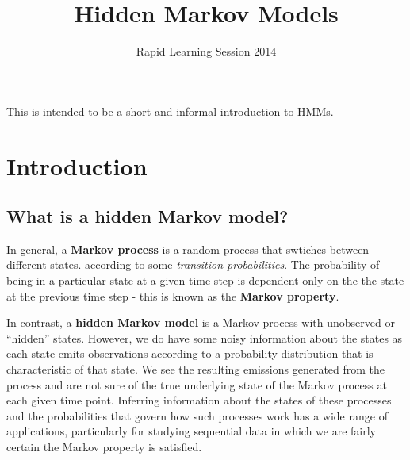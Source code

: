 \documentclass[11pt, oneside]{article}
\title{Hidden Markov Models}
\author{Rapid Learning Session 2014}
\date{}
\begin{document}
\maketitle

This is intended to be a short and informal introduction to HMMs.

\section{Introduction}
\subsection{What is a hidden Markov model?}
In general, a \textbf{Markov process} is a random process that swtiches between different states.
according to some \textit{transition probabilities}. The probability of being in a particular state at a given time step is dependent only on the the state at the previous time step - this is known as the \textbf{Markov property}. %


In contrast, a \textbf{hidden Markov model} is a Markov process with unobserved or ``hidden'' states. However, we do have some noisy information about the states as each state emits observations according to a probability distribution that is characteristic of that state. We see the resulting emissions generated from the process and are not sure of the true underlying state of the Markov process at each given time point. Inferring information about the states of these processes and the probabilities that govern how such processes work has a wide range of applications, particularly for studying sequential data in which we are fairly certain the Markov property is satisfied.
\end{document}
